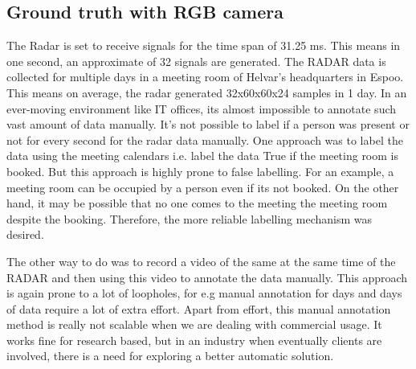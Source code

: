 \subsection{Ground truth with RGB camera}
\label{section:environments}
The Radar is set to receive signals for the time span of 31.25 ms. This means in one second, an approximate of 32 signals are generated. The RADAR data is collected for multiple days in a meeting room of Helvar's headquarters in Espoo. This means on average, the radar generated 32x60x60x24 samples in 1 day. In an ever-moving environment like IT offices, its almost impossible to annotate such vast amount of data manually. It's not possible to label if a person was present or not for every second for the radar data manually.  One approach was to label the data using the meeting calendars i.e. label the data True if the meeting room is booked. But this approach is highly prone to false labelling. For an example, a meeting room can be occupied by a person even if its not booked. On the other hand, it may be possible that no one comes to the meeting the meeting room despite the booking. Therefore, the more reliable labelling mechanism was desired.

The other way to do was to record a video of the same at the same time of the RADAR and then using this video to annotate the data manually. This approach is again prone to a lot of loopholes, for e.g manual annotation for days and days of data require a lot of extra effort. Apart from effort, this manual annotation method is really not scalable when we are dealing with commercial usage. It works fine for research based, but in an industry when eventually clients are involved, there is a need for exploring a better automatic solution. 

